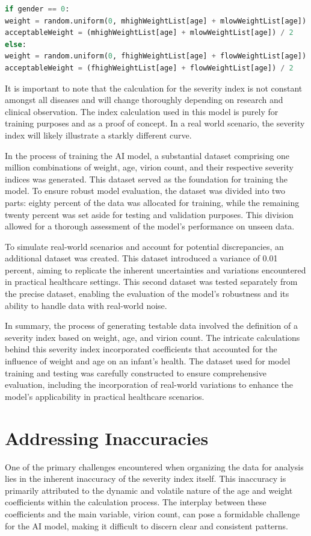 \documentclass{article}
\begin{document}
\begin{lstlisting}[language=Python, caption={Acceptable weight calculation}, label={lst:python}]
if gender == 0:
weight = random.uniform(0, mhighWeightList[age] + mlowWeightList[age])
acceptableWeight = (mhighWeightList[age] + mlowWeightList[age]) / 2
else:
weight = random.uniform(0, fhighWeightList[age] + flowWeightList[age])
acceptableWeight = (fhighWeightList[age] + flowWeightList[age]) / 2
\end{lstlisting}

It is important to note that the calculation for the severity index is not constant
amongst all diseases and will change thoroughly depending on research and clinical
observation. The index calculation used in this model is purely for training purposes and
as a proof of concept. In a real world scenario, the severity index will likely illustrate a
starkly different curve.

In the process of training the AI model, a substantial dataset comprising one
million combinations of weight, age, virion count, and their respective severity indices
was generated. This dataset served as the foundation for training the model. To ensure
robust model evaluation, the dataset was divided into two parts: eighty percent of the data
was allocated for training, while the remaining twenty percent was set aside for testing
and validation purposes. This division allowed for a thorough assessment of the model's
performance on unseen data.

To simulate real-world scenarios and account for potential discrepancies, an
additional dataset was created. This dataset introduced a variance of 0.01 percent, aiming
to replicate the inherent uncertainties and variations encountered in practical healthcare
settings. This second dataset was tested separately from the precise dataset, enabling the
evaluation of the model's robustness and its ability to handle data with real-world noise.

In summary, the process of generating testable data involved the definition of a
severity index based on weight, age, and virion count. The intricate calculations behind
this severity index incorporated coefficients that accounted for the influence of weight
and age on an infant's health. The dataset used for model training and testing was
carefully constructed to ensure comprehensive evaluation, including the incorporation of
real-world variations to enhance the model's applicability in practical healthcare
scenarios.

\section{Addressing Inaccuracies}
One of the primary challenges encountered when organizing the data for analysis
lies in the inherent inaccuracy of the severity index itself. This inaccuracy is primarily
attributed to the dynamic and volatile nature of the age and weight coefficients within the
calculation process. The interplay between these coefficients and the main variable,
virion count, can pose a formidable challenge for the AI model, making it difficult to
discern clear and consistent patterns.
\end{document}
